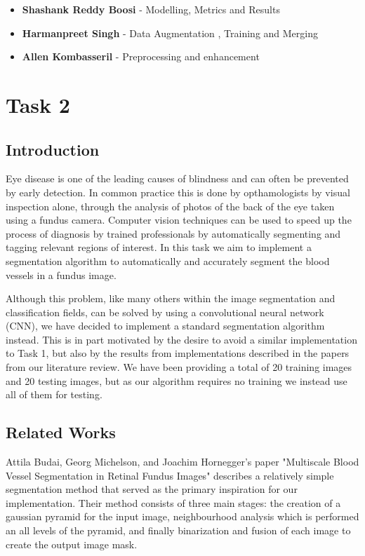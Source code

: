 \documentclass[conference]{IEEEtran}
\begin{document}
\begin{itemize}
		\item \textbf{Shashank Reddy Boosi}  - Modelling, Metrics and Results
		\item \textbf{Harmanpreet Singh}  - Data Augmentation , Training  and Merging
		\item \textbf{Allen Kombasseril}  - Preprocessing and enhancement
\end{itemize} 


\section{Task 2}

\subsection{Introduction}
\par
Eye disease is one of the leading causes of blindness and can often be prevented by early detection. In common practice this is done by opthamologists by visual inspection alone, through the analysis of photos of the back of the eye taken using a fundus camera. Computer vision techniques can be used to speed up the process of diagnosis by trained professionals by automatically segmenting and tagging relevant regions of interest. In this task we aim to implement a segmentation algorithm to automatically and accurately segment the blood vessels in a fundus image.
\par
Although this problem, like many others within the image segmentation and classification fields, can be solved by using a convolutional neural network (CNN), we have decided to implement a standard segmentation algorithm instead. This is in part motivated by the desire to avoid a similar implementation to Task 1, but also by the results from implementations described in the papers from our literature review. We have been providing a total of 20 training images and 20 testing images, but as our algorithm requires no training we instead use all of them for testing.

\subsection{Related Works}
\par
Attila Budai, Georg Michelson, and Joachim Hornegger's paper "Multiscale Blood Vessel Segmentation in Retinal Fundus Images" \cite{21} describes a relatively simple segmentation method that served as the primary inspiration for our implementation. Their method consists of three main stages: the creation of a gaussian pyramid for the input image, neighbourhood analysis which is performed an all levels of the pyramid, and finally binarization and fusion of each image to create the output image mask.
\par
\end{document}
